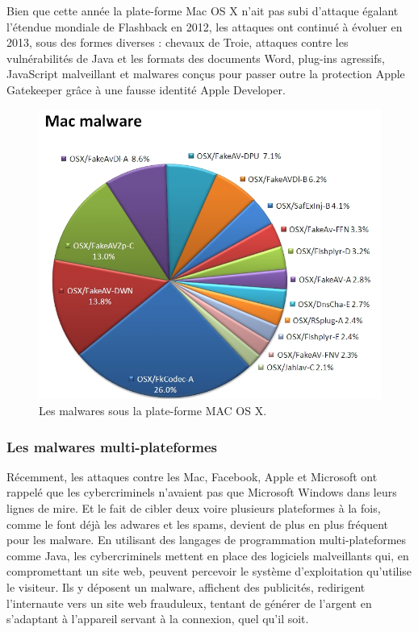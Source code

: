 Bien que cette année la plate-forme Mac OS X n'ait pas subi d'attaque égalant l'étendue mondiale de Flashback en 2012, les attaques ont continué à évoluer en 2013, sous des formes diverses : chevaux de Troie, attaques contre les vulnérabilités de Java et les formats des documents Word, plug-ins agressifs, JavaScript malveillant et malwares conçus pour passer outre la protection Apple Gatekeeper grâce à une fausse identité Apple Developer.
\begin{figure}[H]
\begin{center}
\includegraphics[scale=0.45]{Figures/mac.jpg}
\caption{Les malwares sous la plate-forme MAC OS X.}
\label{fig :kit} 
\end{center}
\end{figure}
\subsubsection{Les malwares multi-plateformes}
Récemment, les attaques contre les Mac, Facebook, Apple et Microsoft ont rappelé que les cybercriminels n'avaient pas que Microsoft Windows dans leurs lignes de mire. Et le fait de cibler deux voire plusieurs plateformes à la fois, comme le font déjà les adwares et les spams, devient de plus en plus fréquent pour les malware. En utilisant des langages de programmation multi-plateformes comme Java, les cybercriminels mettent en place des logiciels malveillants qui, en compromettant un site web, peuvent percevoir le système d'exploitation qu'utilise le visiteur. Ils y déposent un malware, affichent des publicités, redirigent l'internaute vers un site web frauduleux, tentant de générer de l'argent en s'adaptant à l'appareil servant à la connexion, quel qu'il soit.\\

